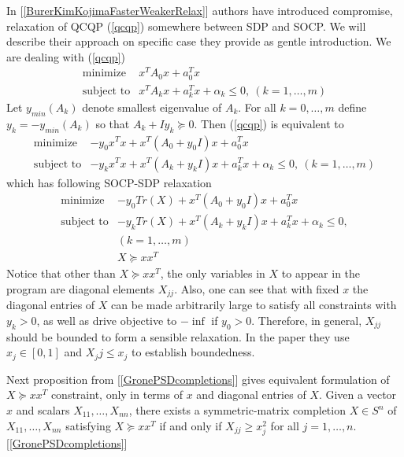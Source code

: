 \documentclass[10pt,oneside]{book}
\theoremstyle{definition}
\begin{document}
In [\ref{BurerKimKojimaFasterWeakerRelax}] authors have introduced compromise, relaxation of QCQP (\ref{qcqp}) somewhere between SDP and SOCP. We will describe their approach on specific case they provide as gentle introduction.
We are dealing with (\ref{qcqp})
\begin{equation}
\begin{array}{ll}
\mbox{minimize}& x^TA_0x + a_0^Tx \\
\mbox{subject to}& x^TA_kx + a_k^Tx + \alpha_k \leq 0, \  (k = 1,\dots ,m)
\end{array} 
\end{equation}
Let  $y_{min}(A_k)$ denote smallest eigenvalue of $A_k$.
For all $k=0,\dots ,m$ define $y_k=-y_{min}(A_k)$ so that $A_k + Iy_k\succeq 0$. Then (\ref{qcqp}) is equivalent to 
\begin{equation*}
\begin{array}{ll}
\mbox{minimize}& -y_0 x^Tx +  x^T(A_0+y_0 I)x + a_0^Tx \\
\mbox{subject to}& -y_kx^Tx +  x^T(A_k+y_kI)x + a_k^Tx + \alpha_k \leq 0, \  (k = 1,\dots ,m)
\end{array} 
\end{equation*}
which has following SOCP-SDP relaxation
\begin{equation}
\label{InBetweenSOCPSDP1}
\begin{array}{ll}
\mbox{minimize}& -y_0 Tr(X) +  x^T(A_0+y_0 I)x + a_0^Tx \\
\mbox{subject to}& -y_k Tr(X) +  x^T(A_k+y_kI)x + a_k^Tx + \alpha_k \leq 0, \\  
&(k = 1,\dots ,m) \\
& X\succeq xx^T
\end{array} 
\end{equation}
Notice that other than $X\succeq xx^T$, the only variables in $X$ to appear in the program are diagonal elements $X_{jj}$.
Also, one can see that with fixed $x$ the diagonal entries of $X$ can be made arbitrarily large to satisfy all constraints with $y_k>0$, as well as drive objective to $-\inf$ if $y_0>0$. Therefore, in general, $X_{jj}$ should be bounded to form a sensible relaxation. In the paper they use $x_j\in [0,1]$ and $X_jj\leq x_j$ to establish boundedness.

Next proposition from [\ref{GronePSDcompletions}] gives equivalent formulation of $X\succeq xx^T$ constraint, only in terms of $x$ and diagonal entries of $X$.
\prop Given a vector $x$ and scalars $X_{11},\dots ,X_{nn}$, there exists
a symmetric-matrix completion $X\in S^n$ of $X_{11},\dots ,X_{nn}$ satisfying $X \succeq xx^T$ if and only if $X_{jj} \geq x^2_j$ for all $j = 1,\dots ,n.$ \rm [\ref{GronePSDcompletions}]
\end{document}
